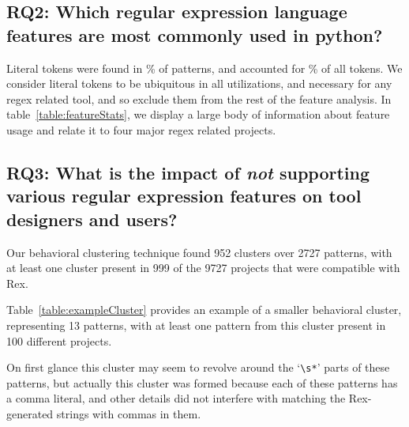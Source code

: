 

\subsection{RQ2: Which regular expression language features are most commonly used in python?}

Literal tokens were found in \% of patterns, and accounted for \% of all tokens.  We consider literal tokens to be ubiquitous in all utilizations, and necessary for any regex related tool, and so exclude them from the rest of the feature analysis.  In table~\ref{table:featureStats}, we display a large body of information about feature usage and relate it to four major regex related projects. 




\subsection{{RQ3:} What is the impact of \emph{not} supporting various regular expression features on tool designers and users?
}


Our behavioral clustering technique found 952 clusters over 2727 patterns, with at least one cluster present in 999 of the 9727 projects that were compatible with Rex.


Table~\ref{table:exampleCluster} provides an example of a smaller behavioral cluster, representing 13 patterns, with at least one pattern from this cluster present in 100 different projects.

On first glance this cluster may seem to revolve around the `\verb!\s*!' parts of these patterns, but actually this cluster was formed because each of these patterns has a comma literal, and other details did not interfere with matching the Rex-generated strings with commas in them.

